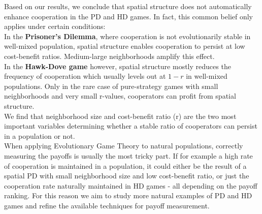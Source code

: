 Based on our results, we conclude that spatial structure does not automatically enhance cooperation in the PD and HD games. In fact, this common belief only applies under certain conditions:\\
In the \textbf{Prisoner's Dilemma}, where cooperation is not evolutionarily stable in well-mixed population, spatial structure enables cooperation to persist at low cost-benefit ratios. Medium-large neighborhoods amplify this effect.\\
In the \textbf{Hawk-Dove game} however, spatial structure mostly reduces the frequency of cooperation which usually levels out at $1-r$ in well-mixed populations. Only in the rare case of pure-strategy games with small neighborhoods and very small r-values, cooperators can profit from spatial structure.\\
We find that neighborhood size and cost-benefit ratio (r) are the two most important variables determining whether a stable ratio of cooperators can persist in a population or not.\\
When applying Evolutionary Game Theory to natural populations, correctly measuring the payoffs is usually the most tricky part. If for example a high rate of cooperation is maintained in a population, it could either be the result of a spatial PD with small neighborhood size and low cost-benefit ratio, or just the cooperation rate naturally maintained in HD games - all depending on the payoff ranking. For this reason we aim to study more natural examples of PD and HD games and refine the available techniques for payoff measurement.
 




